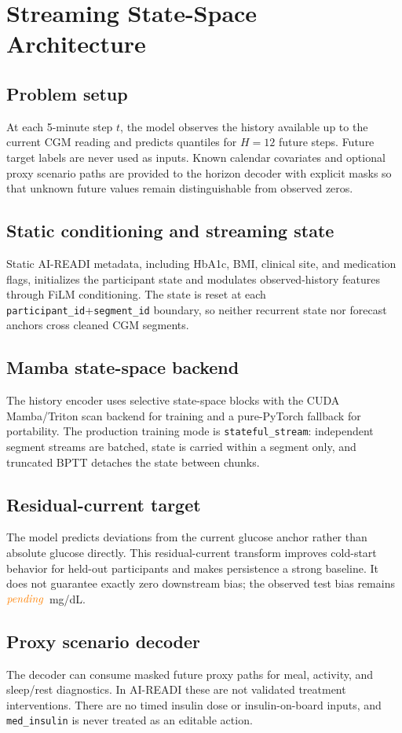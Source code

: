 \section{Streaming State-Space Architecture}
\label{sec:arch}

\subsection{Problem setup}
At each 5-minute step $t$, the model observes the history available up to the current CGM reading and predicts quantiles for $H=12$ future steps. Future target labels are never used as inputs. Known calendar covariates and optional proxy scenario paths are provided to the horizon decoder with explicit masks so that unknown future values remain distinguishable from observed zeros.

\subsection{Static conditioning and streaming state}
Static AI-READI metadata, including HbA1c, BMI, clinical site, and medication flags, initializes the participant state and modulates observed-history features through FiLM conditioning. The state is reset at each \texttt{participant\_id}+\texttt{segment\_id} boundary, so neither recurrent state nor forecast anchors cross cleaned CGM segments.

\subsection{Mamba state-space backend}
The history encoder uses selective state-space blocks with the CUDA Mamba/Triton scan backend for training and a pure-PyTorch fallback for portability. The production training mode is \texttt{stateful\_stream}: independent segment streams are batched, state is carried within a segment only, and truncated BPTT detaches the state between chunks.

\subsection{Residual-current target}
The model predicts deviations from the current glucose anchor rather than absolute glucose directly. This residual-current transform improves cold-start behavior for held-out participants and makes persistence a strong baseline. It does not guarantee exactly zero downstream bias; the observed test bias remains $\textcolor{orange}{\textit{pending}}$~mg/dL.

\subsection{Proxy scenario decoder}
The decoder can consume masked future proxy paths for meal, activity, and sleep/rest diagnostics. In AI-READI these are not validated treatment interventions. There are no timed insulin dose or insulin-on-board inputs, and \texttt{med\_insulin} is never treated as an editable action.
